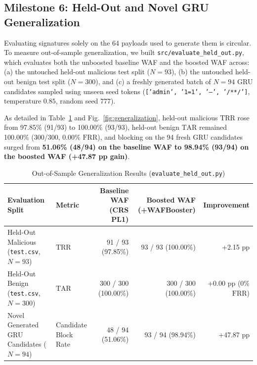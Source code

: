 \documentclass[conference]{IEEEtran}
\newcommand{\TRR}{\ensuremath{\mathrm{TRR}}}
\newcommand{\TAR}{\ensuremath{\mathrm{TAR}}}
\newcommand{\FRR}{\ensuremath{\mathrm{FRR}}}
\begin{document}
\subsection{Milestone 6: Held-Out and Novel GRU Generalization}
Evaluating signatures solely on the 64 payloads used to generate them is circular. To measure out-of-sample generalization, we built \texttt{src/evaluate\_held\_out.py}, which evaluates both the unboosted baseline WAF and the boosted WAF across: (a) the untouched held-out malicious test split ($N=93$), (b) the untouched held-out benign test split ($N=300$), and (c) a freshly generated batch of $N=94$ GRU candidates sampled using unseen seed tokens (\texttt{['admin', '1=1', '--', '/**/']}, temperature $0.85$, random seed $777$).

As detailed in Table~\ref{tab:heldout} and Fig.~\ref{fig:generalization}, held-out malicious \TRR{} rose from 97.85\% (91/93) to 100.00\% (93/93), held-out benign \TAR{} remained 100.00\% (300/300, 0.00\% \FRR{}), and blocking on the 94 fresh GRU candidates surged from \textbf{51.06\% (48/94) on the baseline WAF to 98.94\% (93/94) on the boosted WAF (+47.87 pp gain)}.

\begin{table}[t]
\centering
\caption{Out-of-Sample Generalization Results (\texttt{evaluate\_held\_out.py})}
\label{tab:heldout}
\footnotesize
\begin{tabular}{llrrr}
\toprule
Evaluation Split & Metric & Baseline WAF (CRS PL1) & Boosted WAF (+WAFBooster) & Improvement\\
\midrule
Held-Out Malicious (\texttt{test.csv}, $N=93$) & \TRR{} & 91 / 93 (97.85\%) & 93 / 93 (100.00\%) & +2.15 pp\\
Held-Out Benign (\texttt{test.csv}, $N=300$) & \TAR{} & 300 / 300 (100.00\%) & 300 / 300 (100.00\%) & +0.00 pp (0\% \FRR{})\\
Novel Generated GRU Candidates ($N=94$) & Candidate Block Rate & 48 / 94 (51.06\%) & 93 / 94 (98.94\%) & +47.87 pp\\
\bottomrule
\end{tabular}
\end{table}
\end{document}
